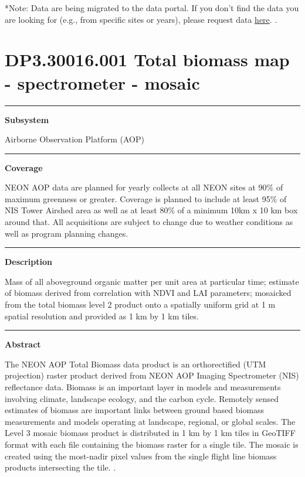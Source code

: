 \documentclass[]{article}
\begin{document}
*Note: Data are being migrated to the data portal. If you don't find the
data you are looking for (e.g., from specific sites or years), please
request data
\href{http://www.neonscience.org/request-airborne-data}{here}. \newpage
.

\section{DP3.30016.001 Total biomass map - spectrometer -
mosaic}\label{dp3.30016.001-total-biomass-map---spectrometer---mosaic}

\begin{center}\rule{0.5\linewidth}{\linethickness}\end{center}

\textbf{Subsystem}

Airborne Observation Platform (AOP)

\begin{center}\rule{0.5\linewidth}{\linethickness}\end{center}

\textbf{Coverage}

NEON AOP data are planned for yearly collects at all NEON sites at 90\%
of maximum greenness or greater. Coverage is planned to include at least
95\% of NIS Tower Airshed area as well as at least 80\% of a minimum
10km x 10 km box around that. All acquisitions are subject to change due
to weather conditions as well as program planning changes.

\begin{center}\rule{0.5\linewidth}{\linethickness}\end{center}

\textbf{Description}

Mass of all aboveground organic matter per unit area at particular time;
estimate of biomass derived from correlation with NDVI and LAI
parameters; mosaicked from the total biomass level 2 product onto a
spatially uniform grid at 1 m spatial resolution and provided as 1 km by
1 km tiles.

\begin{center}\rule{0.5\linewidth}{\linethickness}\end{center}

\textbf{Abstract}

The NEON AOP Total Biomass data product is an orthorectified (UTM
projection) raster product derived from NEON AOP Imaging Spectrometer
(NIS) reflectance data. Biomass is an important layer in models and
measurements involving climate, landscape ecology, and the carbon cycle.
Remotely sensed estimates of biomass are important links between ground
based biomass measurements and models operating at landscape, regional,
or global scales. The Level 3 mosaic biomass product is distributed in 1
km by 1 km tiles in GeoTIFF format with each file containing the biomass
raster for a single tile. The mosaic is created using the most-nadir
pixel values from the single flight line biomass products intersecting
the tile. \newpage
.
\end{document}
